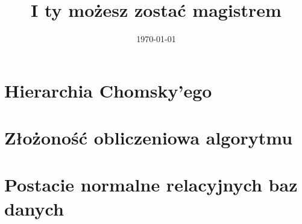 \documentclass[12pt]{article}
\title{I ty możesz zostać magistrem}
\date{\today}
\begin{document}
	
\maketitle
\tableofcontents

\section{Hierarchia Chomsky'ego}



\section{Złożoność obliczeniowa algorytmu}
\section{Postacie normalne relacyjnych baz danych}
\end{document}
